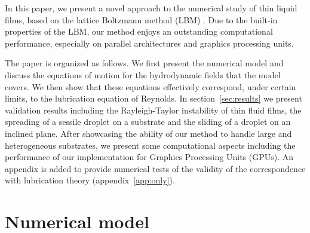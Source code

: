 In this paper, we
present a novel approach to the numerical study of thin liquid films, based on
the lattice Boltzmann method (LBM) \cite{succi}. Due to the
built-in properties of the LBM, our method enjoys an outstanding
computational performance, especially on parallel architectures and graphics
processing units. 

The paper is organized as follows. We first present the numerical
model and discuss the equations of motion for the hydrodynamic fields that the model
covers. We then show that these equations effectively correspond, under certain limits,
to the lubrication equation of Reynolds.
In section~\ref{sec:results} we present
validation results including the Rayleigh-Taylor instability of thin fluid films,
the spreading of a sessile droplet on a substrate and the sliding of a
droplet on an inclined plane. After showcasing the ability of our method to
handle large and heterogeneous substrates, we present some computational
aspects including the performance of our implementation for Graphics Processing
Units (GPUs). 
An appendix is added to provide numerical tests of the validity of the
correspondence with lubrication theory (appendix~\ref{app:only}).

\section{Numerical model}\label{sec:method}

